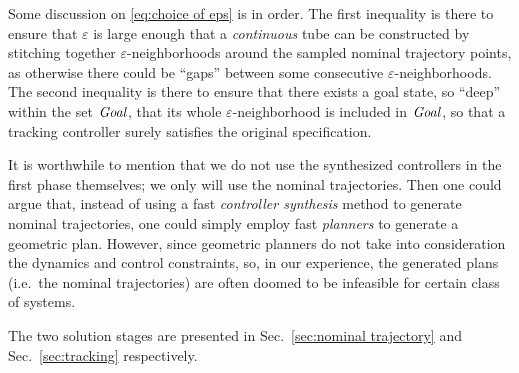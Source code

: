 Some discussion on \eqref{eq:choice of eps} is in order.
The first inequality is there to ensure that $\varepsilon$ is large enough that a \emph{continuous} tube can be constructed by stitching together $\varepsilon$-neighborhoods around the sampled nominal trajectory points, as otherwise there could be ``gaps'' between some consecutive $\varepsilon$-neighborhoods. 
The second inequality is there to ensure that there exists a goal state, so ``deep'' within the set $\mathit{Goal}$, that its whole $\varepsilon$-neighborhood is included in $\mathit{Goal}$, so that a tracking controller surely satisfies the original specification. 

It is worthwhile to mention that we do not use the synthesized controllers in the first phase themselves; we only will use the nominal trajectories.
Then one could argue that, instead of using a fast \emph{controller synthesis} method to generate nominal trajectories, one could simply employ fast \emph{planners} \cite{rrt etc.} to generate a geometric plan.
However, since geometric planners do not take into consideration the dynamics and control constraints, so, in our experience, the generated plans (i.e.\ the nominal trajectories) are often doomed to be infeasible for certain class of systems.

The two solution stages are presented in Sec.~\ref{sec:nominal trajectory} and Sec.~\ref{sec:tracking} respectively.



